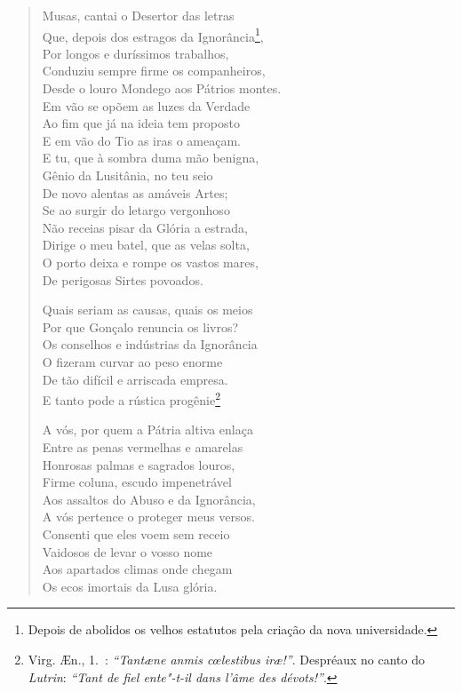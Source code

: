\begin{verse}
Musas, cantai o Desertor das letras\\
Que, depois dos estragos da Ignorância\footnote{ Depois de abolidos os velhos estatutos pela criação da nova universidade.}, \\		\index{\Ignor}
Por longos e duríssimos trabalhos, \\
Conduziu sempre firme os companheiros, \\
Desde o louro Mondego aos Pátrios montes. \\		\index{\Monde}
Em vão se opõem as luzes da Verdade \\
Ao fim que já na ideia tem proposto \\
E em vão do Tio as iras o ameaçam. \\[10pt]

E tu, que à sombra duma mão benigna,\\
Gênio da Lusitânia, no teu seio\\
De novo alentas as amáveis Artes;\\
Se ao surgir do letargo vergonhoso\\
Não receias pisar da Glória a estrada,\\
Dirige o meu batel, que as velas solta,\\
O porto deixa e rompe os vastos mares,\\
De perigosas Sirtes povoados. %

Quais seriam as causas, quais os meios\\
Por que Gonçalo renuncia os livros?\\
Os conselhos e indústrias da Ignorância\\	\index{\Ignor}		\index{\Indus}
O fizeram curvar ao peso enorme\\
De tão difícil e arriscada empresa.\\
E tanto pode a rústica progênie\footnote{ Virg. \AE n., 1.~:
\textit{``Tant\ae ne anmis c\oe lestibus ir\ae !''}. Despréaux no canto  do
\textit{Lutrin}: \textit{``Tant de fiel ente"-t-il dans l'âme des dévots!''}.} 
\\[10pt]		\index{\Lutri}

A vós, por quem a Pátria altiva enlaça\\
Entre as penas vermelhas e amarelas\\
Honrosas palmas e sagrados louros,\\		\index{\Lour}
Firme coluna, escudo impenetrável\\
Aos assaltos do Abuso e da Ignorância,\\			\index{\Ignor}
A vós pertence o proteger meus versos.\\
Consenti que eles voem sem receio\\
Vaidosos de levar o vosso nome\\
Aos apartados climas onde chegam\\
Os ecos imortais da Lusa glória. \\[10pt]



\end{verse}
